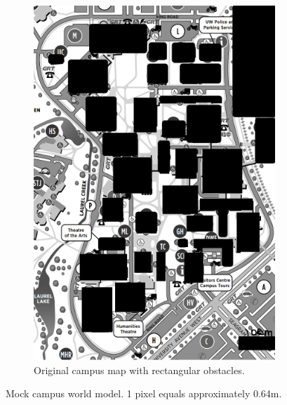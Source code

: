 \begin{figure}[!htbp]
\begin{subfigure}[t]{0.4\textwidth}
        \includegraphics[width=\linewidth]{images/campus_map_block.png}
        \caption{Original campus map with rectangular obstacles.}
    \end{subfigure}
    \caption{Mock campus world model. 1 pixel equals approximately 0.64m.}
    \label{fig:mock_campus}
\end{figure}

